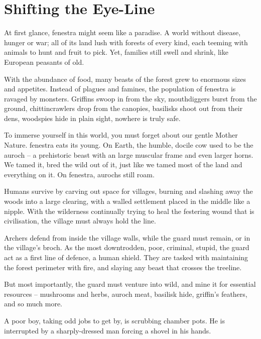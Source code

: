 \section{Shifting the Eye-Line}

\begin{multicols}{2}

\noindent
At first glance, \gls{fenestra} might seem like a paradise.
A world without disease, hunger or war; all of its land lush with forests of every kind, each teeming with animals to hunt and fruit to pick.
Yet, families still swell and shrink, like European peasants of old.

With the abundance of food, many beasts of the forest grew to enormous sizes and appetites.
Instead of plagues and famines, the population of \gls{fenestra} is ravaged by monsters.
Griffins swoop in from the sky, mouthdiggers burst from the ground, chittincrawlers drop from the canopies, basilisks shoot out from their dens, woodspies hide in plain sight, nowhere is truly safe.

To immerse yourself in this world, you must forget about our gentle Mother Nature.
\Gls{fenestra} eats its young.
On Earth, the humble, docile cow used to be the auroch -- a prehistoric beast with an large muscular frame and even larger horns.
We tamed it, bred the wild out of it, just like we tamed most of the land and everything on it.
On \gls{fenestra}, aurochs still roam.

Humans survive by carving out space for \glspl{village}, burning and slashing away the woods into a large clearing, with a walled settlement placed in the middle like a nipple.
With the wilderness continually trying to heal the festering wound that is civilisation, the \gls{village} must always hold the line.

Archers defend from inside the \gls{village} walls, while the \gls{guard} must remain, or in the \gls{village}'s \gls{broch}.
As the most downtrodden, poor, criminal, stupid, the \gls{guard} act as a first line of defence, a human shield.
They are tasked with maintaining the forest perimeter with fire, and slaying any beast that crosses the treeline.

But most importantly, the \gls{guard} must venture into wild, and mine it for essential resources -- mushrooms and herbs, auroch meat, basilisk hide, griffin's feathers, and so much more.

\begin{exampletext}
  A poor boy, taking odd jobs to get by, is scrubbing chamber pots.
  He is interrupted by a sharply-dressed man forcing a shovel in his hands.


\end{exampletext}
\end{multicols}
